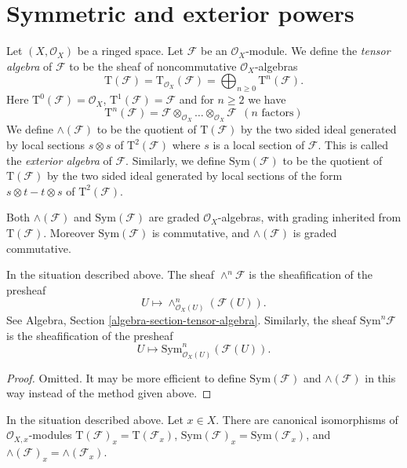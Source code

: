 \section{Symmetric and exterior powers}
\label{section-symmetric-exterior}

\noindent
Let $(X, \mathcal{O}_X)$ be a ringed space.
Let $\mathcal{F}$ be an $\mathcal{O}_X$-module.
We define the {\it tensor algebra} of $\mathcal{F}$ to be
the sheaf of noncommutative $\mathcal{O}_X$-algebras
$$
\text{T}(\mathcal{F})
=
\text{T}_{\mathcal{O}_X}(\mathcal{F})
= \bigoplus\nolimits_{n \geq 0} \text{T}^n(\mathcal{F}).
$$
Here $\text{T}^0(\mathcal{F}) = \mathcal{O}_X$,
$\text{T}^1(\mathcal{F}) = \mathcal{F}$
and for $n \geq 2$ we have
$$
\text{T}^n(\mathcal{F}) =
\mathcal{F} \otimes_{\mathcal{O}_X} \ldots \otimes_{\mathcal{O}_X} \mathcal{F}
\ \ (n\text{ factors})
$$
We define $\wedge(\mathcal{F})$ to be the quotient of
$\text{T}(\mathcal{F})$ by the two sided ideal generated by
local sections $s \otimes s$ of $\text{T}^2(\mathcal{F})$ where
$s$ is a local section of $\mathcal{F}$. This is
called the {\it exterior algebra} of $\mathcal{F}$.
Similarly, we define $\text{Sym}(\mathcal{F})$ to be
the quotient of $\text{T}(\mathcal{F})$ by the two
sided ideal generated by local sections of the form
$s \otimes t - t \otimes s$ of $\text{T}^2(\mathcal{F})$.

\medskip\noindent
Both $\wedge(\mathcal{F})$ and $\text{Sym}(\mathcal{F})$ are graded
$\mathcal{O}_X$-algebras, with grading inherited from $\text{T}(\mathcal{F})$.
Moreover $\text{Sym}(\mathcal{F})$
is commutative, and $\wedge(\mathcal{F})$ is graded commutative.

\begin{lemma}
\label{lemma-local-tensor-algebra}
In the situation described above.
The sheaf $\wedge^n\mathcal{F}$ is the sheafification of the
presheaf
$$
U \longmapsto \wedge^n_{\mathcal{O}_X(U)}(\mathcal{F}(U)).
$$
See Algebra, Section \ref{algebra-section-tensor-algebra}.
Similarly, the sheaf $\text{Sym}^n\mathcal{F}$ is the sheafification
of the presheaf
$$
U \longmapsto \text{Sym}^n_{\mathcal{O}_X(U)}(\mathcal{F}(U)).
$$
\end{lemma}

\begin{proof}
Omitted. It may be more efficient to define $\text{Sym}(\mathcal{F})$
and $\wedge(\mathcal{F})$ in this way instead of the method
given above.
\end{proof}

\begin{lemma}
\label{lemma-stalk-tensor-algebra}
In the situation described above. Let $x \in X$.
There are canonical isomorphisms of $\mathcal{O}_{X, x}$-modules
$\text{T}(\mathcal{F})_x = \text{T}(\mathcal{F}_x)$,
$\text{Sym}(\mathcal{F})_x = \text{Sym}(\mathcal{F}_x)$, and
$\wedge(\mathcal{F})_x = \wedge(\mathcal{F}_x)$.
\end{lemma}

